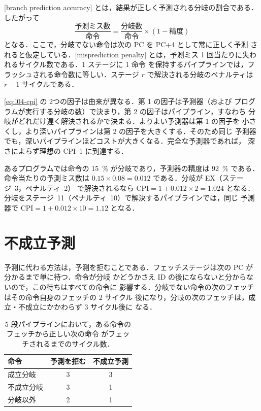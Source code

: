 \documentclass[../main.tex]{subfiles}
\begin{document}
\begin{definition}[精度とペナルティ]
  [branch prediction accuracy]%
  とは，結果が正しく予測される分岐の割合である．したがって
  \begin{equation*}
    \frac{\text{予測ミス数}}{\text{命令}} =
    \frac{\text{分岐数}}{\text{命令}} \times
    (1 - \text{精度})
  \end{equation*}
  となる．ここで，分岐でない命令は次の PC を PC+4 として常に正しく予測
  されると仮定している．[misprediction penalty]%
  とは，予測ミス 1 回当たりに失われるサイクル数である．1 ステージに 1 命令
  を保持するパイプラインでは，フラッシュされる命令数に等しい．ステージ
  $r$ で解決される分岐のペナルティは $r-1$ サイクルである．
\end{definition}

\cref{eq:l04-cpi} の 2つの因子は由来が異なる．第 1 の因子は予測器（および
プログラムが実行する分岐の数）で決まり，第 2 の因子はパイプライン，すなわち
分岐がどれだけ遅く解決されるかで決まる．よりよい予測器は第 1 の因子を
小さくし，より深いパイプラインは第 2 の因子を大きくする．そのため同じ
予測器でも，深いパイプラインほどコストが大きくなる．完全な予測器であれば，
深さによらず理想の CPI~1 に到達する．

\begin{example}
  \label{ex:l04-cpi}
  あるプログラムでは命令の \SI{15}{\percent} が分岐であり，予測器の精度は
  \SI{92}{\percent} である．命令当たりの予測ミス数は
  $0.15 \times 0.08 = 0.012$ である．分岐が EX（ステージ~3，ペナルティ~2）
  で解決されるなら $\text{CPI} = 1 + 0.012 \times 2 = 1.024$ となる．
  分岐をステージ~11（ペナルティ~10）で解決するパイプラインでは，同じ
  予測器で $\text{CPI} = 1 + 0.012 \times 10 = 1.12$ となる．
\end{example}

\section{不成立予測}
\label{sec:l04-not-taken}

予測に代わる方法は，予測を拒むことである．フェッチステージは次の PC が
分かるまで単に待つ．命令が分岐
かどうかさえ ID の後にならないと分からないので，この待ちはすべての命令に
影響する．分岐でない命令の次のフェッチはその命令自身のフェッチの 2 サイクル
後になり，分岐の次のフェッチは，成立・不成立にかかわらず 3 サイクル後に
なる．

\begin{table}[b]
  \centering\small
  \caption{5 段パイプラインにおいて，ある命令のフェッチから正しい次の命令
    がフェッチされるまでのサイクル数．}
  \label{tab:l04-not-taken}
  \begin{tabular}{@{}lcc@{}}
    \toprule
    命令          & 予測を拒む & 不成立予測 \\
    \midrule
    成立分岐      & 3 & 3 \\
    不成立分岐    & 3 & 1 \\
    分岐以外      & 2 & 1 \\
    \bottomrule
  \end{tabular}
\end{table}
\end{document}

